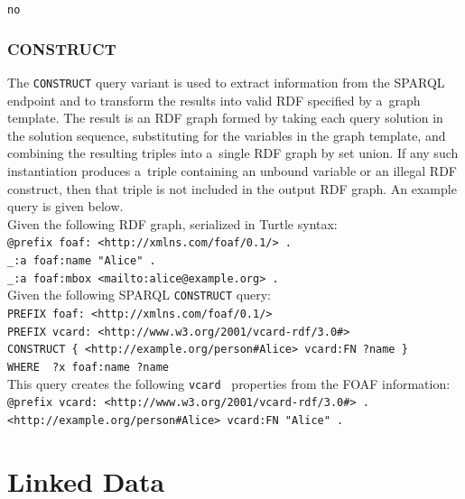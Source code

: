 \texttt{no}\\

\subsubsection{CONSTRUCT}

The \texttt{CONSTRUCT} query variant is used to extract
information from the SPARQL endpoint
and to transform the results into valid RDF
specified by a~graph template.
The result is an RDF graph formed by taking
each query solution in the solution sequence,
substituting for the variables in the graph template,
and combining the resulting triples into
a~single RDF graph by set union.
If any such instantiation produces a~triple
containing an unbound variable or an illegal RDF construct,
then that triple is not included in the output RDF graph.
An example query is given below.\\

\noindent Given the following RDF graph,
serialized in Turtle syntax:\\

\texttt{@prefix foaf: <http://xmlns.com/foaf/0.1/> .}\\
\texttt{\indent \_:a foaf:name "Alice" .}\\
\texttt{\indent \_:a foaf:mbox <mailto:alice@example.org> .}\\

\noindent Given the following SPARQL \texttt{CONSTRUCT} query:\\

\texttt{PREFIX foaf: <http://xmlns.com/foaf/0.1/>}\\
\texttt{\indent PREFIX vcard: <http://www.w3.org/2001/vcard-rdf/3.0\#>}\\
\texttt{\indent CONSTRUCT \{ <http://example.org/person\#Alice> vcard:FN ?name \}}\\
\texttt{\indent WHERE { ?x foaf:name ?name }}\\

\noindent This query creates the following
\texttt{vcard}~\cite{dawson1998vcard}
properties from the FOAF information:\\

\texttt{@prefix vcard: <http://www.w3.org/2001/vcard-rdf/3.0\#> .}\\
\texttt{\indent <http://example.org/person\#Alice> vcard:FN "Alice" .}\\

\section{Linked Data}

